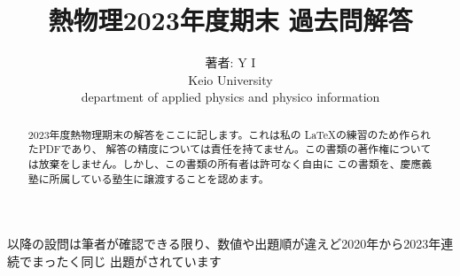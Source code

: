 \documentclass[dvipdfmx,a4paper]{jsarticle}
\title{熱物理2023年度期末 過去問解答}
\author{著者:
Y I\\Keio University \\department of applied physics and physico information}
\begin{document}
\maketitle


\begin{abstract}
  2023年度熱物理期末の解答をここに記します。これは私の \LaTeX の練習のため作られたPDFであり、
  解答の精度については責任を持てません。この書類の著作権については放棄をしません。しかし、この書類の所有者は許可なく自由に
  この書類を、慶應義塾に所属している塾生に譲渡することを認めます。
\end{abstract}




\color{red}
以降の設問は筆者が確認できる限り、数値や出題順が違えど2020年から2023年連続でまったく同じ
出題がされています
\color{black}




\end{document}
